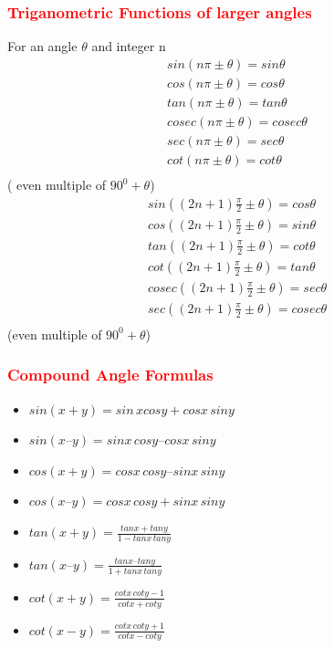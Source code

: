 \documentclass[12pt]{article}
\theoremstyle{colored}
\theoremstyle{subcolored}
\begin{document}
\begin{multicols}{2}
 \subsubsection*{\large \textcolor{red}{Triganometric Functions of larger angles}}
For an angle $\theta$  and integer n\\
\begin{align*}
    sin(n \pi \pm \theta)=sin \theta \\
    cos(n \pi \pm \theta)=cos \theta \\
        tan(n \pi \pm \theta)=tan \theta \\
          cosec(n \pi \pm \theta)=cosec \theta \\
            sec(n \pi \pm \theta)=sec \theta \\
              cot(n \pi \pm \theta)=cot \theta \\
\end{align*}
( even multiple of $90^0 + \theta$)
\begin{align*}
    sin((2n+1) \frac{\pi}{2} \pm \theta)=cos \theta \\
    cos((2n+1) \frac{\pi}{2} \pm \theta)=sin \theta \\
    tan((2n+1) \frac{\pi}{2} \pm \theta)=cot \theta \\
    cot((2n+1) \frac{\pi}{2} \pm \theta)=tan \theta \\
    cosec((2n+1) \frac{\pi}{2} \pm \theta)=sec \theta \\
    sec((2n+1) \frac{\pi}{2} \pm \theta)=cosec \theta \\
\end{align*}
(even multiple of $90^0 + \theta$)
\subsubsection*{\large \textcolor{red}{Compound Angle Formulas}}
\begin{itemize}
    \item $sin(x + y) = sin\, x cos y + cos x \,sin y$

\item $sin(x – y) = sin x \,cos y – cos x\, sin y$

\item $cos(x + y) = cos x\, cos y – sin x \,sin y$

\item $cos(x – y) = cos x\, cos y + sin x\, sin y$

\item  $tan ( x + y) =\frac{tan x + tan y}{1 - tan x\, tan y}$
\item $tan ( x – y) =\frac{tan x – tan y}{1 + tan x\, tan y}$
\item $cot(x+y)=\frac{cotx \,coty-1}{cot x+cot y}$
\item  $cot(x-y)=\frac{cotx \,coty+1}{cot x-cot y}$


\end{itemize}
\end{multicols}
\end{document}
